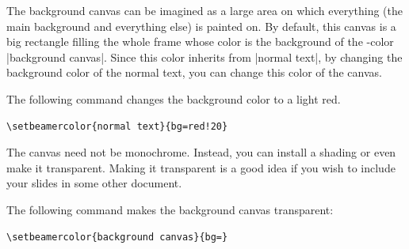 The background canvas can be imagined as a large area on which everything (the main background and everything else) is painted on. By default, this canvas is a big rectangle filling the whole frame whose color is the background of the \beamer-color |background canvas|. Since this color inherits from |normal text|, by changing the background color of the normal text, you can change this color of the canvas.

\example
The following command changes the background color to a light red.
\begin{verbatim}
\setbeamercolor{normal text}{bg=red!20}
\end{verbatim}

The canvas need not be monochrome. Instead, you can install a shading or even make it transparent. Making it transparent is a good idea if you wish to include your slides in some other document.

\example
The following command makes the background canvas transparent:
\begin{verbatim}
\setbeamercolor{background canvas}{bg=}
\end{verbatim}

